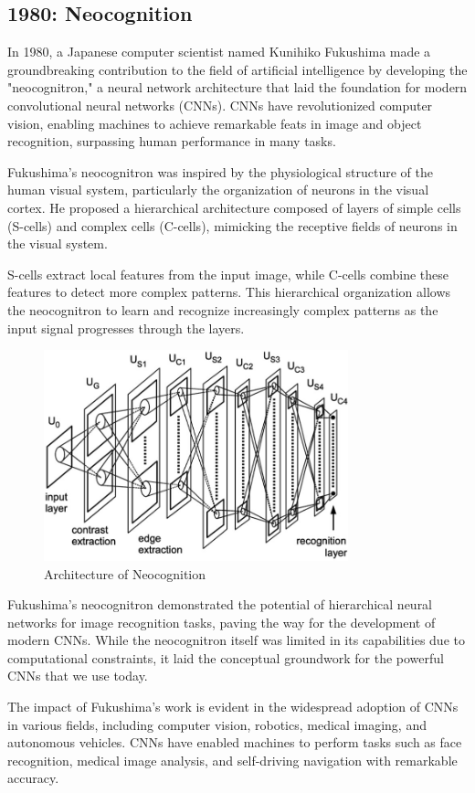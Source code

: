 \documentclass{report}
\begin{document}
\subsection{1980: Neocognition}
In 1980, a Japanese computer scientist named Kunihiko Fukushima made a groundbreaking contribution to the field of artificial intelligence by developing the "neocognitron," a neural network architecture that laid the foundation for modern convolutional neural networks (CNNs). CNNs have revolutionized computer vision, enabling machines to achieve remarkable feats in image and object recognition, surpassing human performance in many tasks.

Fukushima's neocognitron was inspired by the physiological structure of the human visual system, particularly the organization of neurons in the visual cortex. He proposed a hierarchical architecture composed of layers of simple cells (S-cells) and complex cells (C-cells), mimicking the receptive fields of neurons in the visual system.

S-cells extract local features from the input image, while C-cells combine these features to detect more complex patterns. This hierarchical organization allows the neocognitron to learn and recognize increasingly complex patterns as the input signal progresses through the layers.

\begin{figure}[ht]
	\includegraphics[width=250pt]{46}
	\centering
	\caption{Architecture of Neocognition}
\end{figure}
Fukushima's neocognitron demonstrated the potential of hierarchical neural networks for image recognition tasks, paving the way for the development of modern CNNs. While the neocognitron itself was limited in its capabilities due to computational constraints, it laid the conceptual groundwork for the powerful CNNs that we use today.

The impact of Fukushima's work is evident in the widespread adoption of CNNs in various fields, including computer vision, robotics, medical imaging, and autonomous vehicles. CNNs have enabled machines to perform tasks such as face recognition, medical image analysis, and self-driving navigation with remarkable accuracy.
\end{document}
